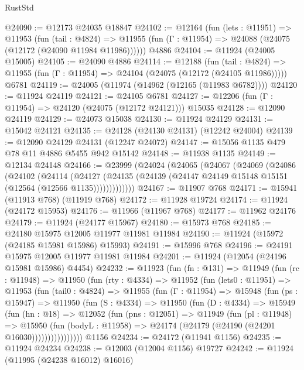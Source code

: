 \begin{lexlean}{RustStd}
\begin{coremodule}
{\begin{coremodule}
{{{{{{{{{{{{{{{{{{{{{{{{{{{{{{{{{{{{{{{{{{{{{{{{{{{{{{{{{{{{{{{{{{{{{{{{{{{{{{{{@24090 := @12173 @24035 @18847
@24102 := @12164
    (fun (lets : @11951) =>
    @11953
      (fun (tail : @4824) =>
      @11955 (fun (Γ : @11954) => @24088 (@24075 (@12172 (@24090 @11984 @11986))))))
    @4886
@24104 := @11924 (@24005 @15005)
@24105 := @24090 @4886
@24114 := @12188
    (fun (tail : @4824) => @11955 (fun (Γ : @11954) => @24104 (@24075 (@12172 (@24105 @11986)))))
    @6781
@24119 := @24005 (@11974 (@14962 (@12165 (@11983 @6782))))
@24120 := @11924 @24119
@24121 := @24105 @6781
@24127 := @12206 (fun (Γ : @11954) => @24120 (@24075 (@12172 @24121))) @15035
@24128 := @12090 @24119
@24129 := @24073 @15038
@24130 := @11924 @24129
@24131 := @15042 @24121
@24135 := @24128 (@24130 @24131) (@12242 @24004)
@24139 := @12090 @24129 @24131 (@12247 @24072)
@24147 := @15056 @1135 @479 @78 @11 @4886 @5455 @942 @15142
@24148 := @11938 @1135
@24149 := @12134 @24148
@24166 := @23999
    (@24024
      (@24065
        (@24067
          (@24069
            (@24086
              (@24102
                (@24114
                  (@24127
                    (@24135 (@24139 (@24147 @24149 @15148 @15151 (@12564 (@12566 @1135)))))))))))))
@24167 := @11907 @768
@24171 := @15941 (@11913 @768) (@11919 @768)
@24172 := @11928 @19724
@24174 := @11924 (@24172 @15953)
@24176 := @11966 (@11967 @768)
@24177 := @11962 @24176
@24179 := @11924 (@24177 @15967)
@24180 := @15973 @768
@24185 := @24180 @15975 @12005 @11977 @11981 @11984
@24190 := @11924 (@15972 (@24185 @15981 @15986) @15993)
@24191 := @15996 @768
@24196 := @24191 @15975 @12005 @11977 @11981 @11984
@24201 := @11924 (@12054 (@24196 @15981 @15986) @4454)
@24232 := @11923
    (fun (fn : @131) =>
    @11949
      (fun (rc : @11948) =>
      @11950
        (fun (rty : @4334) =>
        @11952
          (fun (lets0 : @11951) =>
          @11953
            (fun (tail0 : @4824) =>
            @11955
              (fun (Γ : @11954) =>
              @15948
                (fun (ps : @15947) =>
                @11950
                  (fun (S : @4334) =>
                  @11950
                    (fun (D : @4334) =>
                    @15949
                      (fun (hn : @18) =>
                      @12052
                        (fun (pns : @12051) =>
                        @11949
                          (fun (pl : @11948) =>
                          @15950
                            (fun (bodyL : @11958) =>
                            @24174 (@24179 (@24190 (@24201 @16030))))))))))))))))
    @1156
@24234 := @24172 (@11941 @1156)
@24235 := @11924 @24234
@24238 := @12003 (@12004 @1156) @19727
@24242 := @11924 (@11995 (@24238 @16012) @16016)
}}}}}}}}}}}}}}}}}}}}}}}}}}}}}}}}}}}}}}}}}}}}}}}}}}}}}}}}}}}}}}}}}}}}}}}}}}}}}}}}
\end{coremodule}}
\end{coremodule}
\end{lexlean}

